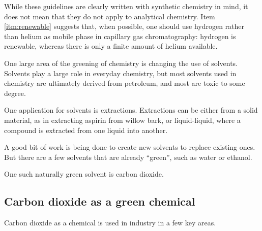 While these guidelines are clearly written with synthetic chemistry in mind, it
does not mean that they do not apply to analytical chemistry. Item
\ref{itm:renewable} suggests that, when possible, one should use hydrogen rather
than helium as mobile phase in capillary gas chromatography: hydrogen is
renewable, whereas there is only a finite amount of helium available. 

One large area of the greening of chemistry is changing the use of solvents.
Solvents play a large role in everyday chemistry, but most solvents used in
chemistry are ultimately derived from petroleum, and most are toxic to some
degree.

One application for solvents is extractions. Extractions can be either from a
solid material, as in extracting aspirin from willow bark, or liquid-liquid,
where a compound is extracted from one liquid into another. 

A good bit of work is being done to create new solvents to replace existing
ones. But there are a few solvents that are
already ``green'', such as water or ethanol.

One such naturally green solvent is carbon dioxide. 
 

\subsection{Carbon dioxide as a green chemical}

Carbon dioxide as a chemical is used in industry in a few key areas.

